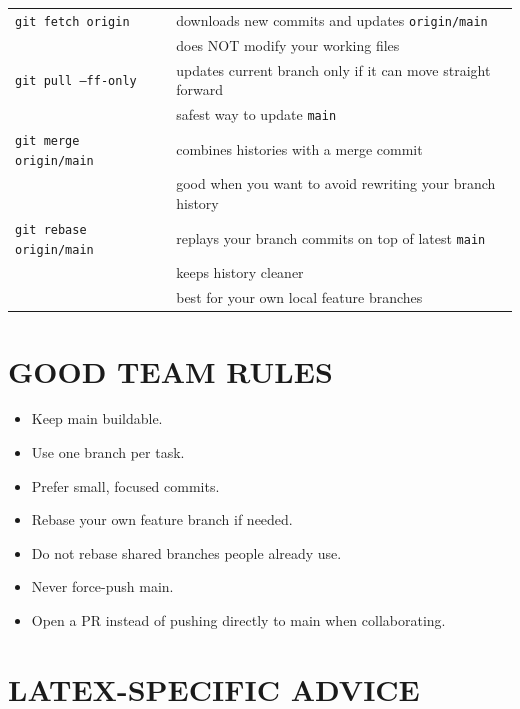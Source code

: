\documentclass[a4paper,11pt]{article}
\begin{document}
\begin{tabular}{@{}l l@{}}
\texttt{git fetch origin} & downloads new commits and updates \texttt{origin/main} \\
                          & does NOT modify your working files \\[0.5em]

\texttt{git pull --ff-only} & updates current branch only if it can move straight forward \\
                            & safest way to update \texttt{main} \\[0.5em]

\texttt{git merge origin/main} & combines histories with a merge commit \\
                               & good when you want to avoid rewriting your branch history \\[0.5em]

\texttt{git rebase origin/main} & replays your branch commits on top of latest \texttt{main} \\
                                & keeps history cleaner \\
                                & best for your own local feature branches \\
\end{tabular}

\section*{GOOD TEAM RULES}

\begin{itemize}
  \renewcommand{\labelitemi}{$\rightarrow$}
  \item Keep main buildable.
  \item Use one branch per task.
  \item Prefer small, focused commits.
  \item Rebase your own feature branch if needed.
  \item Do not rebase shared branches people already use.
  \item Never force-push main.
  \item Open a PR instead of pushing directly to main when collaborating.
\end{itemize}

\section*{LATEX-SPECIFIC ADVICE}
\end{document}
